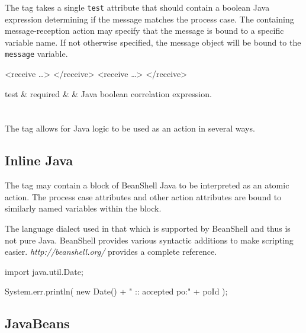The  tag takes a single \verb|test| attribute
that should contain a boolean Java expression determining if
the message matches the process case.  The containing message-reception
action may specify that the message is bound to a specific variable
name.  If not otherwise specified, the message object will be
bound to the \verb|message| variable. 

\begin{codelisting}
<receive \dots>
</receive>
<receive  \dots>
</receive>
\end{codelisting}

\begin{attrDefs}
test		&	required	&			& Java boolean correlation expression. \\
\end{attrDefs}

\section{}

The  tag allows for Java logic to be used
as an action in several ways.

\subsection{Inline Java}

The  tag may contain a block of BeanShell Java
to be interpreted as an atomic action.  The process case attributes
and other action attributes are bound to similarly named variables
within the block.

The language dialect used in that which is supported by BeanShell
and thus is not pure Java.  BeanShell provides various syntactic
additions to make scripting easier.  \emph{http://beanshell.org/}
provides a complete reference.

\begin{codelisting}
    import java.util.Date;

    System.err.println( new Date() + " :: accepted po:" + poId );
\end{codelisting}

\subsection{JavaBeans}

